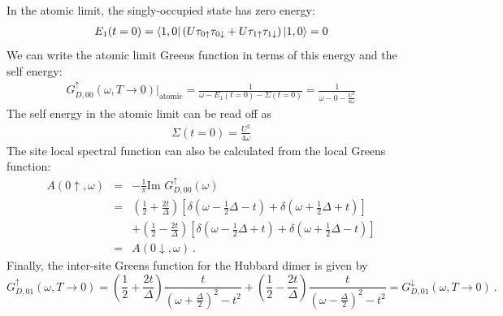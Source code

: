 \documentclass[12pt]{article}
\numberwithin{equation}{section}
\begin{document}
In the atomic limit, the singly-occupied state has zero energy:
\begin{equation}\begin{aligned}
	E_1(t=0) = \bra{1,0}\left(U \tau_{0 \uparrow}\tau_{0 \downarrow} + U \tau_{1 \uparrow}\tau_{1 \downarrow}\right) \ket{1,0} = 0
\end{aligned}\end{equation}
We can write the atomic limit Greens function in terms of this energy and the self energy:
\begin{equation}\begin{aligned}
	G_{D,00}^\uparrow(\omega, T \to 0) \bigg\vert_\text{atomic} = \frac{1}{\omega - E_1(t=0) - \Sigma(t=0)} = \frac{1}{\omega - 0 -\frac{U^2}{4\omega}}
\end{aligned}\end{equation}
The self energy in the atomic limit can be read off as 
\begin{equation}\begin{aligned}
	\label{dimer_selfenergy}
\Sigma(t=0) = \frac{U^2}{4\omega}
\end{aligned}\end{equation}
The site local spectral function can also be calculated from the local Greens function:
\begin{eqnarray}
A(0\uparrow, \omega) &=& - \frac{1}{\pi}\text{Im }G_{D,00}^\uparrow(\omega)\nonumber\\
			     &=& \left( \frac{1}{2} + \frac{2t}{\Delta} \right)\left[\delta(\omega - \frac{1}{2}\Delta - t) + \delta(\omega + \frac{1}{2}\Delta + t)\right]\nonumber\\ 
			     &&+ \left( \frac{1}{2} - \frac{2t}{\Delta} \right) \left[\delta(\omega - \frac{1}{2}\Delta + t) + \delta(\omega + \frac{1}{2}\Delta - t)\right]\\ 
			     &=& A(0\downarrow, \omega)~.\nonumber
\end{eqnarray}
Finally, the inter-site Greens function for the Hubbard dimer is given by
\begin{equation}
\label{dimer_intersite_G}
	G_{D,01}^\uparrow(\omega, T \to 0) = \left( \frac{1}{2} + \frac{2t}{\Delta} \right) \frac{t}{(\omega +\frac{\Delta}{2})^2 - t^2} + \left( \frac{1}{2} - \frac{2t}{\Delta} \right) \frac{t}{(\omega -\frac{\Delta}{2})^2 - t^2} = G_{D,01}^\downarrow(\omega, T \to 0)~.
\end{equation}
\end{document}
